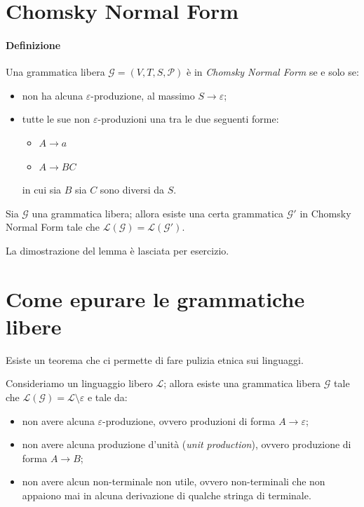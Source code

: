 \documentclass[class=book, crop=false, oneside]{standalone}
\begin{document}
\section{Chomsky Normal Form}
\paragraph{Definizione}
Una grammatica libera \(\mathcal{G} = (V, T, S, \mathcal{P})\) è in \emph{Chomsky Normal Form} se e solo se:
\begin{itemize}
  \item non ha alcuna \(\varepsilon\)-produzione, al massimo \(S \rightarrow \varepsilon\);
  \item tutte le sue non \(\varepsilon\)-produzioni  una tra le due seguenti forme:
  \begin{itemize}
    \item \(A \rightarrow a\)
    \item \(A \rightarrow BC\)
  \end{itemize}
  in cui sia \(B\) sia \(C\) sono diversi da \(S\).
\end{itemize}

\begin{lemma}
  Sia \(\mathcal{G}\) una grammatica libera; allora esiste una certa grammatica \(\mathcal{G'}\) in Chomsky Normal Form tale che \(\mathcal{L(G)} = \mathcal{L(G')}\).
\end{lemma}

\noindent La dimostrazione del lemma è lasciata per esercizio.

\section{Come epurare le grammatiche libere}
Esiste un teorema che ci permette di fare pulizia etnica sui linguaggi.
\begin{theorem}
  Consideriamo un linguaggio libero \(\mathcal{L}\); allora esiste una grammatica libera \(\mathcal{G}\) tale che \(\mathcal{L(G)} = \mathcal{L}\setminus\varepsilon\) e tale da:
  \begin{itemize}
    \item non avere alcuna \(\varepsilon\)-produzione, ovvero produzioni di forma \(A \rightarrow \varepsilon\);
    \item non avere alcuna produzione d'unità (\emph{unit production}), ovvero produzione di forma \(A \rightarrow B\);
    \item non avere alcun non-terminale non utile, ovvero non-terminali che non appaiono mai in alcuna derivazione di qualche stringa di terminale.
  \end{itemize}
\end{theorem}
\end{document}
